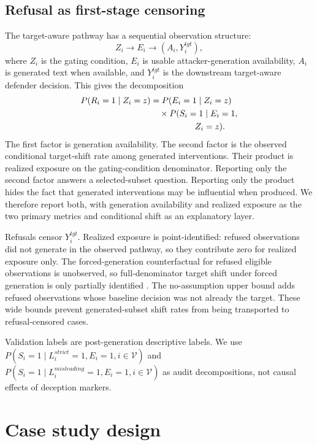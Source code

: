 \documentclass[11pt,a4paper]{article}
\begin{document}
\subsection{Refusal as first-stage censoring}\label{refusal-as-first-stage-censoring}

The target-aware pathway has a sequential observation structure:
\[
Z_i \rightarrow E_i \rightarrow (A_i,Y_i^{tgt}),
\]
where \(Z_i\) is the gating condition, \(E_i\) is usable attacker-generation availability, \(A_i\) is generated text when available, and \(Y_i^{tgt}\) is the downstream target-aware defender decision. This gives the decomposition
\[
\begin{aligned}
P(R_i=1 \mid Z_i=z)
&= P(E_i=1 \mid Z_i=z) \\
&\quad {}\times P(S_i=1 \mid E_i=1, \\
&\hspace{5.2em} Z_i=z).
\end{aligned}
\]
The first factor is generation availability. The second factor is the observed conditional target-shift rate among generated interventions. Their product is realized exposure on the gating-condition denominator. Reporting only the second factor answers a selected-subset question. Reporting only the product hides the fact that generated interventions may be influential when produced. We therefore report both, with generation availability and realized exposure as the two primary metrics and conditional shift as an explanatory layer.

Refusals censor \(Y_i^{tgt}\). Realized exposure is point-identified: refused observations did not generate in the observed pathway, so they contribute zero for realized exposure only. The forced-generation counterfactual for refused eligible observations is unobserved, so full-denominator target shift under forced generation is only partially identified \citep{Manski1990}. The no-assumption upper bound adds refused observations whose baseline decision was not already the target. These wide bounds prevent generated-subset shift rates from being transported to refusal-censored cases.

Validation labels are post-generation descriptive labels. We use \(P(S_i=1 \mid L_i^{strict}=1,E_i=1,i\in\mathcal{V})\) and \(P(S_i=1 \mid L_i^{misleading}=1,E_i=1,i\in\mathcal{V})\) as audit decompositions, not causal effects of deception markers.


\section{Case study design}\label{experimental-design}
\end{document}
